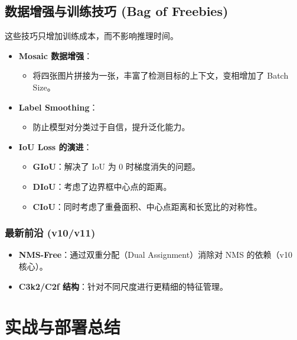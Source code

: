\documentclass[11pt,a4paper]{article}
\begin{document}
\subsection{数据增强与训练技巧 (Bag of Freebies)}
这些技巧只增加训练成本，而不影响推理时间。
\begin{itemize}
    \item \textbf{Mosaic 数据增强}：
    \begin{itemize}
        \item 将四张图片拼接为一张，丰富了检测目标的上下文，变相增加了 Batch Size。
    \end{itemize}
    \item \textbf{Label Smoothing}：
    \begin{itemize}
        \item 防止模型对分类过于自信，提升泛化能力。
    \end{itemize}
    \item \textbf{IoU Loss 的演进}：
    \begin{itemize}
        \item \textbf{GIoU}：解决了 IoU 为 0 时梯度消失的问题。
        \item \textbf{DIoU}：考虑了边界框中心点的距离。
        \item \textbf{CIoU}：同时考虑了重叠面积、中心点距离和长宽比的对称性。
    \end{itemize}
\end{itemize}



\subsubsection{最新前沿 (v10/v11)}
\begin{itemize}
    \item \textbf{NMS-Free}：通过双重分配（Dual Assignment）消除对 NMS 的依赖（v10 核心）。
    \item \textbf{C3k2/C2f 结构}：针对不同尺度进行更精细的特征管理。
\end{itemize}



\section{实战与部署总结}
\end{document}
